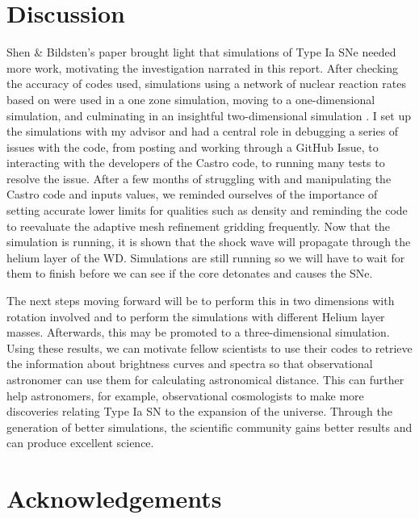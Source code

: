 \documentclass[preprint]{aastex62}
\begin{document}
\section{Discussion}

  
  Shen \& Bildsten's paper brought light that simulations of Type Ia SNe needed more work, motivating the investigation narrated in this report. After checking the accuracy of codes used, simulations using a network of nuclear reaction rates based on \citet{shenNbildsten} were used in a one zone simulation, moving to a one-dimensional simulation, and culminating in an insightful two-dimensional simulation \citep{shenNbildsten}. I set up the simulations with my advisor and had a central role in debugging a series of issues with the code, from posting and working through a GitHub Issue, to interacting with the developers of the Castro code, to running many tests to resolve the issue. After a few months of struggling with and manipulating the Castro code and inputs values, we reminded ourselves of the importance of setting accurate lower limits for qualities such as density and reminding the code to reevaluate the adaptive mesh refinement gridding frequently. Now that the simulation is running, it is shown that the shock wave will propagate through the helium layer of the WD. Simulations are still running so we will have to wait for them to finish before we can see if the core detonates and causes the SNe. 
  
  The next steps moving forward will be to perform this in two dimensions with rotation involved and to perform the simulations with different Helium layer masses. Afterwards, this may be promoted to a three-dimensional simulation. Using these results, we can motivate fellow scientists to use their codes to retrieve the information about brightness curves and spectra so that observational astronomer can use them for calculating astronomical distance. This can further help astronomers, for example, observational cosmologists to make more discoveries relating Type Ia SN to the expansion of the universe. Through the generation of better simulations, the scientific community gains better results and can produce excellent science. 

  
\section{Acknowledgements}
\end{document}
